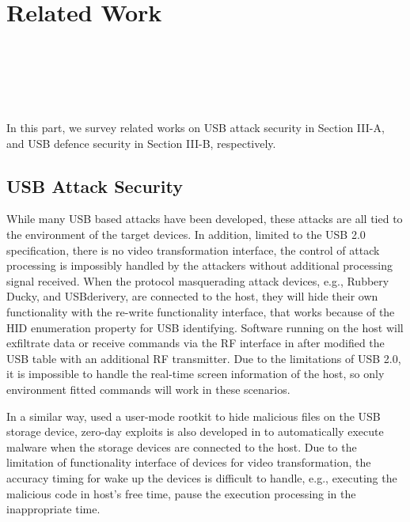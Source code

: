 \section{Related Work}
\label{sec:related_work}
\\
\\
\\
\\
\\

In this part, we survey related works on USB attack security in Section III-A, and USB defence security in Section III-B, respectively.

\subsection{USB Attack Security}
While many USB based  attacks have been developed, these attacks are all tied to the environment of the target devices. In addition, limited to the USB 2.0\cite{usb20} specification, there is no video transformation interface, the control of attack processing is impossibly handled by the attackers without additional processing signal received. When the  protocol masquerading attack devices, e.g., Rubbery Ducky\cite{rubber}, \cite{rubberducky2020} and USBderivery\cite{usbdriver}, are connected to the host, they will hide their own functionality with the re-write functionality interface, that works because of the HID enumeration property for USB identifying. Software running on the host will exfiltrate data or receive commands via the RF interface in \cite{turnip} after modified the USB table with an additional RF transmitter. Due to the limitations of USB 2.0, it is impossible to handle the real-time screen information of the host, so only environment fitted commands will work in these scenarios.

In a similar way, \cite{duqu} used a user-mode rootkit to hide malicious files on the USB storage device, zero-day exploits is also developed in \cite{zero-day} to automatically execute malware when the storage devices are connected to the host. Due to the limitation of functionality interface of devices for video transformation, the accuracy timing for wake up the devices is difficult to handle, e.g., executing the malicious code in host's free time, pause the execution processing in the inappropriate time. 

